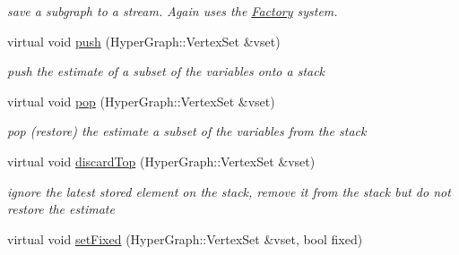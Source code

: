 \begin{DoxyCompactItemize}
\begin{DoxyCompactList}\small\item\em save a subgraph to a stream. Again uses the \hyperlink{classg2o_1_1Factory}{Factory} system. \end{DoxyCompactList}\item 
\hypertarget{structg2o_1_1OptimizableGraph_a1d65a6854936147a92f7ba664302993e}{virtual void \hyperlink{structg2o_1_1OptimizableGraph_a1d65a6854936147a92f7ba664302993e}{push} (Hyper\-Graph\-::\-Vertex\-Set \&vset)}\label{structg2o_1_1OptimizableGraph_a1d65a6854936147a92f7ba664302993e}

\begin{DoxyCompactList}\small\item\em push the estimate of a subset of the variables onto a stack \end{DoxyCompactList}\item 
\hypertarget{structg2o_1_1OptimizableGraph_a83425dbe755d22877ba692e93e04a6af}{virtual void \hyperlink{structg2o_1_1OptimizableGraph_a83425dbe755d22877ba692e93e04a6af}{pop} (Hyper\-Graph\-::\-Vertex\-Set \&vset)}\label{structg2o_1_1OptimizableGraph_a83425dbe755d22877ba692e93e04a6af}

\begin{DoxyCompactList}\small\item\em pop (restore) the estimate a subset of the variables from the stack \end{DoxyCompactList}\item 
\hypertarget{structg2o_1_1OptimizableGraph_a74cbd91a3e05c1f497b4675b0e70113a}{virtual void \hyperlink{structg2o_1_1OptimizableGraph_a74cbd91a3e05c1f497b4675b0e70113a}{discard\-Top} (Hyper\-Graph\-::\-Vertex\-Set \&vset)}\label{structg2o_1_1OptimizableGraph_a74cbd91a3e05c1f497b4675b0e70113a}

\begin{DoxyCompactList}\small\item\em ignore the latest stored element on the stack, remove it from the stack but do not restore the estimate \end{DoxyCompactList}\item 
\hypertarget{structg2o_1_1OptimizableGraph_a07514f6186d19b6d893a771c0bb6abf9}{virtual void \hyperlink{structg2o_1_1OptimizableGraph_a07514f6186d19b6d893a771c0bb6abf9}{set\-Fixed} (Hyper\-Graph\-::\-Vertex\-Set \&vset, bool fixed)}\label{structg2o_1_1OptimizableGraph_a07514f6186d19b6d893a771c0bb6abf9}


\end{DoxyCompactItemize}
